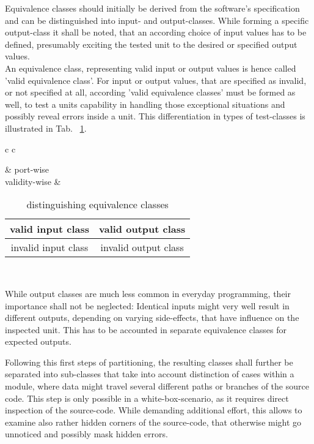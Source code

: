 	Equivalence classes should initially be derived from the software's specification and can be distinguished into input- and output-classes. While forming a specific output-class it shall be noted, that an according choice of input values has to be defined, presumably exciting the tested unit to the desired or specified output values. \\
	An equivalence class, representing valid input or output values is hence called 'valid equivalence class'. For input or output values, that are specified as invalid, or not specified at all, according 'valid equivalence classes' must be formed as well, to test a units capability in handling those exceptional situations and possibly reveal errors inside a unit. This differentiation in types of test-classes is illustrated in Tab. ~\ref{EquiClasses}.
	
	\begin{table}[h!]
	\begin{center}
		\begin{tabular}{c c}
		
						& port-wise  \\
		validity-wise	& \begin{tabular}{|c | c|} \hline
						valid input class 	& valid output class   \\  \hline
						invalid input class 	& invalid output class \\ \hline
							\end{tabular}		\\ %
		\end{tabular}
			\caption{distinguishing equivalence classes}
			\label{EquiClasses}
	\end{center}
	\end{table}
	While output classes are much less common in everyday programming, their importance shall not be neglected: Identical inputs might very well result in different outputs, depending on varying side-effects, that have influence on the inspected unit. This has to be accounted in separate equivalence classes for expected outputs.
	
	Following this first steps of partitioning, the resulting classes shall further be separated into sub-classes that take into account distinction of cases within a module, where data might travel several different paths or branches of the source code. This step is only possible in a white-box-scenario, as it requires direct inspection of the source-code. While demanding additional effort, this allows to examine also rather hidden corners of the source-code, that otherwise might go unnoticed and possibly mask hidden errors.

